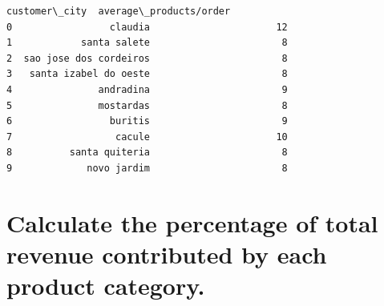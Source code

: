 \documentclass[11pt]{article}
\makeatletter
\newcommand{\boxspacing}{\kern\kvtcb@left@rule\kern\kvtcb@boxsep}
\newcommand{\prompt}[4]{
        {\ttfamily\llap{{\color{#2}[#3]:\hspace{3pt}#4}}\vspace{-\baselineskip}}
    }
\makeatother
\begin{document}
            \begin{tcolorbox}[breakable, size=fbox, boxrule=.5pt, pad at break*=1mm, opacityfill=0]
\prompt{Out}{outcolor}{14}{\boxspacing}
\begin{Verbatim}[commandchars=\\\{\}]
            customer\_city  average\_products/order
0                 claudia                      12
1            santa salete                       8
2  sao jose dos cordeiros                       8
3   santa izabel do oeste                       8
4               andradina                       9
5               mostardas                       8
6                 buritis                       9
7                  cacule                      10
8          santa quiteria                       8
9             novo jardim                       8
\end{Verbatim}
\end{tcolorbox}
        
    \hypertarget{calculate-the-percentage-of-total-revenue-contributed-by-each-product-category.}{%
\section{Calculate the percentage of total revenue contributed by each
product
category.}\label{calculate-the-percentage-of-total-revenue-contributed-by-each-product-category.}}
\end{document}
